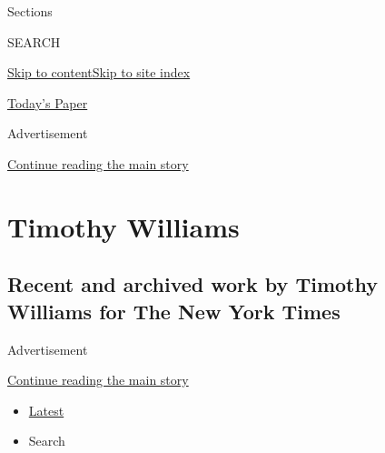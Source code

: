 Sections

SEARCH

\protect\hyperlink{site-content}{Skip to
content}\protect\hyperlink{site-index}{Skip to site index}

\href{https://myaccount.nytimes3xbfgragh.onion/auth/login?response_type=cookie\&client_id=vi}{}

\href{https://www.nytimes3xbfgragh.onion/section/todayspaper}{Today's
Paper}

Advertisement

\protect\hyperlink{after-top}{Continue reading the main story}

\hypertarget{timothy-williams}{%
\section{Timothy Williams}\label{timothy-williams}}

\hypertarget{recent-and-archived-work-by-timothy-williams-for-the-new-york-times}{%
\subsection{Recent and archived work by Timothy Williams for The New
York
Times}\label{recent-and-archived-work-by-timothy-williams-for-the-new-york-times}}

Advertisement

\protect\hyperlink{after-mid1}{Continue reading the main story}

\begin{itemize}
\tightlist
\item
  \protect\hyperlink{stream-panel}{Latest}
\item
  Search
\end{itemize}

